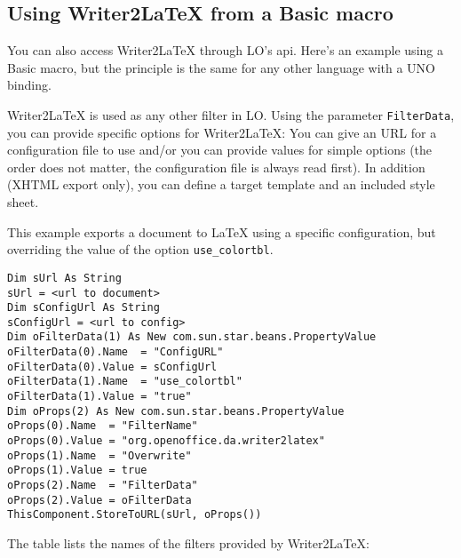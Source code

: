 \documentclass{article}
\newcommand\textstyleSourceText[1]{\texttt{\textmd{#1}}}
\begin{document}
\subsection{Using Writer2LaTeX from a Basic macro}
{\mdseries
You can also access Writer2LaTeX through LO's api. Here's an example using a Basic macro, but the principle is the same for any other language with a UNO binding.}

{\mdseries
Writer2LaTeX is used as any other filter in LO. Using the parameter \textstyleSourceText{FilterData}, you can provide specific options for Writer2LaTeX: You can give an URL for a configuration file to use and/or you can provide values for simple options (the order does not matter, the configuration file is always read first). In addition (XHTML export only), you can define a target template and an included style sheet.}

{\mdseries
This example exports a document to LaTeX using a specific configuration, but overriding the value of the option \textstyleSourceText{use\_colortbl}.}

\begin{verbatim}
Dim sUrl As String
sUrl = <url to document>
Dim sConfigUrl As String
sConfigUrl = <url to config>
Dim oFilterData(1) As New com.sun.star.beans.PropertyValue
oFilterData(0).Name  = "ConfigURL"
oFilterData(0).Value = sConfigUrl
oFilterData(1).Name  = "use_colortbl"
oFilterData(1).Value = "true"
Dim oProps(2) As New com.sun.star.beans.PropertyValue
oProps(0).Name  = "FilterName"
oProps(0).Value = "org.openoffice.da.writer2latex"
oProps(1).Name  = "Overwrite"
oProps(1).Value = true
oProps(2).Name  = "FilterData"
oProps(2).Value = oFilterData
ThisComponent.StoreToURL(sUrl, oProps())
\end{verbatim}
{\mdseries
The table lists the names of the filters provided by Writer2LaTeX:}
\end{document}
